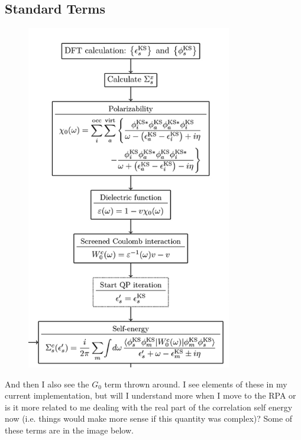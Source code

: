\documentclass[12pt]{article}
\begin{document}
\subsection{Standard Terms}
\begin{figure}[h]
    \centering
    \includegraphics[width=0.8\textwidth]{not}
\end{figure}
And then I also see the $G_0$ term thrown around. I see elements of these in my current implementation, but will I understand more when I move to the RPA or is it more related to me dealing with the real part of the correlation self energy now (i.e. things would make more sense if this quantity was complex)? Some of these terms are in the image below.
\end{document}
